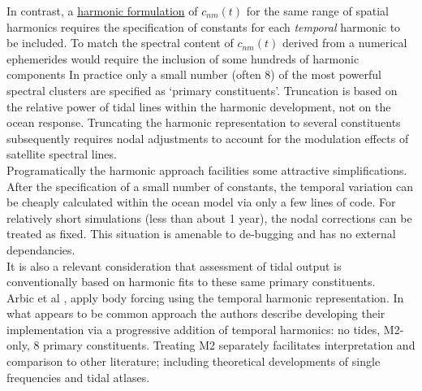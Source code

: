 In contrast, a \underline{harmonic formulation} of $c_{nm}(t)$ for the same range of spatial harmonics requires the specification of constants for each \emph{temporal} harmonic to be included.  
To match the spectral content of $c_{nm}(t)$ derived from a numerical ephemerides would require the inclusion of some hundreds of harmonic components \citep[pp3]{Desai:2006wo}
In practice only a small number (often 8) of the most powerful spectral clusters are specified as `primary constituents'.  Truncation is based on the relative power of tidal lines within the harmonic development, not on the ocean response.
Truncating the harmonic representation to several constituents subsequently requires nodal adjustments to account for the modulation effects of satellite spectral lines.\\
Programatically the harmonic approach facilities some attractive simplifications.  After the specification of a small number of constants, the temporal variation can be cheaply calculated within the ocean model via only a few lines of code.   
For relatively short simulations (less than about 1 year), the nodal corrections can be treated as fixed.   This situation is amenable to de-bugging and has no external dependancies.\\
It is also a relevant consideration that assessment of tidal output is conventionally based on harmonic fits to these same primary constituents.\\

Arbic et al \citep{Arbic:2010us}, apply body forcing using the temporal harmonic representation.  In what appears to be common approach the authors describe developing their implementation via a progressive addition of temporal harmonics: no tides, M2-only, 8 primary constituents.  Treating M2 separately facilitates interpretation and comparison to other literature; including theoretical developments of single frequencies and tidal atlases.






